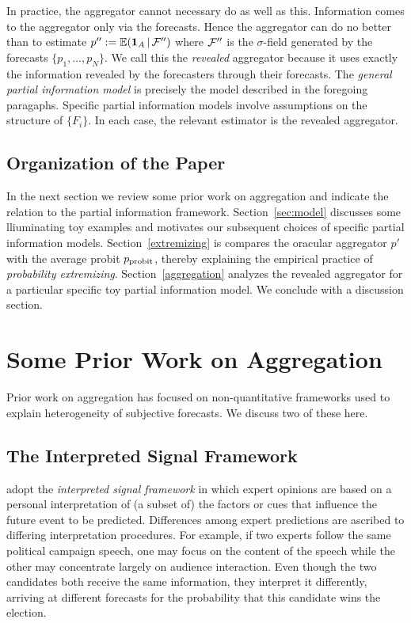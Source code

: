 \documentclass[11pt]{article}
\newcommand{\E}{\mathbb{E}}
\theoremstyle{definition}
\theoremstyle{definition}
\def\one{{\bf 1}}
\def\F{{\cal F}}
\def\E{{\mathbb E}}
\def\|{\, | \,}
\def\probit{p_{\rm probit}}
\begin{document}
In practice, the aggregator cannot necessary do as well as this.  
Information comes to the aggregator only via the forecasts.  Hence the 
aggregator can do no better than to estimate $p'' := \E (\one_A \| \F'')$
where $\F''$ is the $\sigma$-field generated by the forecasts
$\{ p_1 , \ldots , p_N \}$.  We call this the {\em revealed} aggregator 
because it uses exactly the information revealed by the forecasters
through their forecasts.  The {\em general partial information model} 
is precisely the model described in the foregoing paragaphs.  
Specific partial information models involve assumptions on
the structure of $\{ F_i \}$.  In each case, the relevant estimator 
is the revealed aggregator. 

\subsection{Organization of the Paper}

In the next section we review some prior work on aggregation and 
indicate the relation to the partial information framework.
Section~\ref{sec:model} discusses some lliuminating toy examples 
and motivates our subsequent choices of specific partial information 
models.  Section~\ref{extremizing} is compares the oracular
aggregator $p'$ with the average probit $\probit$, thereby
explaining the empirical practice of {\em probability extremizing}.
Section~\ref{aggregation} analyzes the revealed aggregator for a
particular specific toy partial information model.  We conclude
with a discussion section.


\section{Some Prior Work on Aggregation}
\label{sec:prior}

Prior work on aggregation has focused on non-quantitative
frameworks used to explain heterogeneity of subjective forecasts.  
We discuss two of these here.

\subsection{The Interpreted Signal Framework}
\label{ss:inerpreted}

\citet{hong2009interpreted} adopt the {\em interpreted 
signal framework} in which expert opinions are based on a personal
interpretation of (a subset of) the factors or cues that influence
the future event to be predicted.  Differences among expert
predictions are ascribed to differing interpretation procedures.
For example, if two experts follow the same political campaign
speech, one may focus on the content of the speech while the other 
may concentrate largely on audience interaction.  Even though the
two candidates both receive the same information, they interpret
it differently, arriving at different forecasts for the probability
that this candidate wins the election.  
\end{document}
